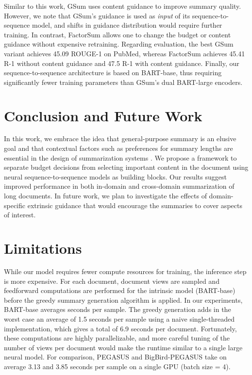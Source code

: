 \documentclass[11pt,table]{article}
\begin{document}
Similar to this work, GSum \citep{dou_gsum_2021} uses content guidance to improve summary quality. However, we note that GSum's guidance is used as \emph{input} of its sequence-to-sequence model, and shifts in guidance distribution would require further training. In contrast, FactorSum allows one to change the budget or content guidance without expensive retraining. Regarding evaluation, the best GSum variant achieves 45.09 ROUGE-1 on PubMed, whereas FactorSum achieves 45.41 R-1 without content guidance and 47.5 R-1 with content guidance. Finally, our sequence-to-sequence architecture is based on BART-base, thus requiring significantly fewer training parameters than GSum's dual BART-large encoders.

\section{Conclusion and Future Work}
In this work, we embrace the idea that general-purpose summary is an elusive goal and that contextual factors such as preferences for summary lengths are essential in the design of summarization systems \citep{jones1999automatic}. We propose a framework to separate budget decisions from selecting important content in the document using neural sequence-to-sequence models as building blocks. Our results suggest improved performance in both in-domain and cross-domain summarization of long documents. In future work, we plan to investigate the effects of domain-specific extrinsic guidance that would encourage the summaries to cover aspects of interest. 

\section*{Limitations}
\label{sec:limitations}
While our model requires fewer compute resources for training, the inference step is more expensive. For each document,  document views are sampled and  feedforward computations are performed for the intrinsic model (BART-base) before the greedy summary generation algorithm is applied. In our experiments, BART-base averages  seconds per sample. The greedy generation adds in the worst case an average of 1.5 seconds per sample using a naive single-threaded implementation, which gives a total of 6.9 seconds per document. Fortunately, these computations are highly parallelizable, and more careful tuning of the number of views per document  would make the runtime similar to a single large neural model. For comparison, PEGASUS and BigBird-PEGASUS take on average 3.13 and 3.85 seconds per sample on a single GPU (batch size = 4).
\end{document}
